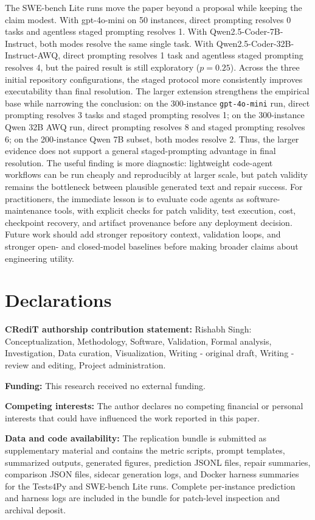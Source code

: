 \documentclass[preprint,12pt]{elsarticle}
\begin{document}
The SWE-bench Lite runs move the paper beyond a proposal while keeping the claim modest. With gpt-4o-mini on 50 instances, direct prompting resolves 0 tasks and agentless staged prompting resolves 1. With Qwen2.5-Coder-7B-Instruct, both modes resolve the same single task. With Qwen2.5-Coder-32B-Instruct-AWQ, direct prompting resolves 1 task and agentless staged prompting resolves 4, but the paired result is still exploratory ($p = 0.25$). Across the three initial repository configurations, the staged protocol more consistently improves executability than final resolution. The larger extension strengthens the empirical base while narrowing the conclusion: on the 300-instance \texttt{gpt-4o-mini} run, direct prompting resolves 3 tasks and staged prompting resolves 1; on the 300-instance Qwen 32B AWQ run, direct prompting resolves 8 and staged prompting resolves 6; on the 200-instance Qwen 7B subset, both modes resolve 2. Thus, the larger evidence does not support a general staged-prompting advantage in final resolution. The useful finding is more diagnostic: lightweight code-agent workflows can be run cheaply and reproducibly at larger scale, but patch validity remains the bottleneck between plausible generated text and repair success. For practitioners, the immediate lesson is to evaluate code agents as software-maintenance tools, with explicit checks for patch validity, test execution, cost, checkpoint recovery, and artifact provenance before any deployment decision. Future work should add stronger repository context, validation loops, and stronger open- and closed-model baselines before making broader claims about engineering utility.

\section*{Declarations}

\noindent\textbf{CRediT authorship contribution statement:} Rishabh Singh: Conceptualization, Methodology, Software, Validation, Formal analysis, Investigation, Data curation, Visualization, Writing - original draft, Writing - review and editing, Project administration.

\noindent\textbf{Funding:} This research received no external funding.

\noindent\textbf{Competing interests:} The author declares no competing financial or personal interests that could have influenced the work reported in this paper.

\noindent\textbf{Data and code availability:} The replication bundle is submitted as supplementary material and contains the metric scripts, prompt templates, summarized outputs, generated figures, prediction JSONL files, repair summaries, comparison JSON files, sidecar generation logs, and Docker harness summaries for the Tests4Py and SWE-bench Lite runs. Complete per-instance prediction and harness logs are included in the bundle for patch-level inspection and archival deposit.
\end{document}
